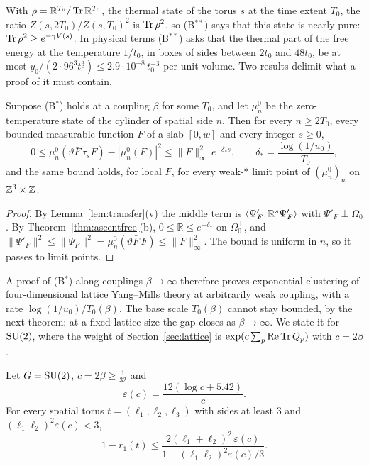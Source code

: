 With $\rho=\mathbb R^{T_0}/\operatorname{Tr}\mathbb R^{T_0}$, the thermal state of the
torus $s$ at the time extent $T_0$, the ratio $Z(s,2T_0)/Z(s,T_0)^2$ is
$\operatorname{Tr}\rho^2$, so (B$^{**}$) says that this state is nearly pure: $\operatorname{Tr}\rho^2\ge
e^{-\gamma V(s)}$. In physical terms (B$^{**}$) asks that the thermal part of the free energy
at the temperature $1/t_0$, in boxes of sides between $2t_0$ and $48t_0$, be
at most $y_0/(2\cdot96^3t_0^3)\le2.9\cdot10^{-8}\,t_0^{-3}$ per unit volume.
Two results delimit what a proof of it must contain.

\begin{proposition}
\label{prop:Bhard}
Suppose \textup{(B$^*$)} holds at a coupling $\beta$ for some $T_0$, and let
$\mu^0_n$ be the zero-temperature state of the cylinder of spatial side $n$.
Then for every $n\ge2T_0$, every bounded measurable function $F$ of a slab
$[0,w]$ and every integer $s\ge0$,
\[
0\le\mu^0_n(\vartheta\bar F\,\tau_sF)-|\mu^0_n(F)|^2\le\|F\|_\infty^2\,
e^{-\delta_*s},\qquad\delta_*=\frac{\log(1/u_0)}{T_0},
\]
and the same bound holds, for local $F$, for every weak-$*$ limit point of
$(\mu^0_n)_n$ on $\mathbb{Z}^3\times\mathbb{Z}$.
\end{proposition}

\begin{proof}
By Lemma~\ref{lem:transfer}(v) the middle term is $\langle \Psi'_F,\mathbb R^s
\Psi'_F\rangle$ with $\Psi'_F\perp\Omega_0$. By Theorem~\ref{thm:ascentfree}(b),
$0\le\mathbb R\le e^{-\delta_*}$ on $\Omega_0^\perp$, and $\|\Psi'_F\|^2\le
\|\Psi_F\|^2=\mu^0_n(\vartheta\bar F\,F)\le\|F\|_\infty^2$. The bound is
uniform in $n$, so it passes to limit points.
\end{proof}

A proof of (B$^*$) along couplings $\beta\to\infty$ therefore proves
exponential clustering of four-dimensional lattice Yang--Mills theory at
arbitrarily weak coupling, with a rate $\log(1/u_0)/T_0(\beta)$. The base
scale $T_0(\beta)$ cannot stay bounded, by the next theorem: at a fixed
lattice size the gap closes as $\beta\to\infty$. We state it for $\mathrm{SU}(2)$,
where the weight of Section~\ref{sec:lattice} is $\exp(c\sum_p\operatorname{Re}\operatorname{Tr} Q_p)$
with $c=2\beta$.

\begin{theorem}\label{thm:gapcloses}
Let $G=\mathrm{SU}(2)$, $c=2\beta\ge\frac1{32}$ and
\[
\varepsilon(c)=\frac{12(\log c+5.42)}{c} .
\]
For every spatial torus $t=(\ell_1,\ell_2,\ell_3)$ with sides at least $3$
and $(\ell_1\ell_2)^2\varepsilon(c)<3$,
\[
1-r_1(t)\le\frac{2(\ell_1+\ell_2)^2\,\varepsilon(c)}{1-(\ell_1\ell_2)^2
\varepsilon(c)/3} .
\]
\end{theorem}

